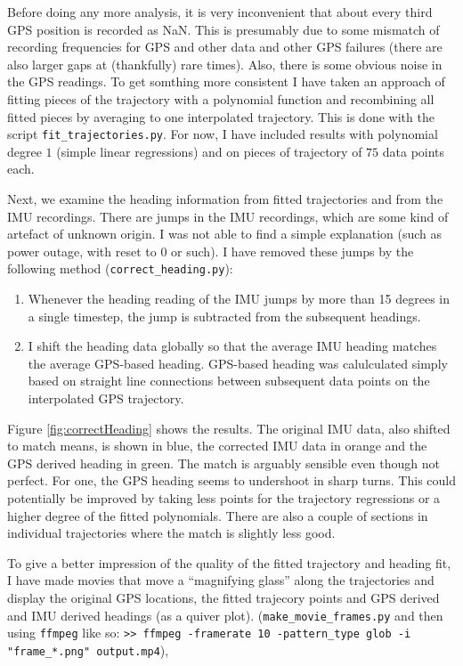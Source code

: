 \documentclass[a4]{article}
\begin{document}
Before doing any more analysis, it is very inconvenient that about
every third GPS position is recorded as NaN. This is presumably due to
some mismatch of recording frequencies for GPS and other data and
other GPS failures (there are also larger gaps at (thankfully) rare
times). Also, there is some obvious noise in the GPS readings. To get
somthing more consistent I have taken an approach of fitting pieces of
the trajectory with a polynomial function and recombining all fitted
pieces by averaging to one interpolated trajectory. This is done with the script
\verb+fit_trajectories.py+. For now, I have included results with
polynomial degree $1$ (simple linear regressions) and on pieces of
trajectory of $75$ data points each.

Next, we examine the heading information from fitted trajectories and
from the IMU recordings. There are jumps in the IMU recordings, which
are some kind of artefact of unknown origin. I was not able to find a
simple explanation (such as power outage, with reset to 0 or such). I
have removed these jumps by the following method (\verb+correct_heading.py+):
\begin{enumerate}
  \item Whenever the heading reading of the IMU jumps by more than 15
    degrees in a single timestep, the jump is subtracted from the
    subsequent headings.
  \item I shift the heading data globally so that the average IMU
    heading matches the average GPS-based heading. GPS-based heading
    was calulculated simply based on straight line connections between
    subsequent data points on the interpolated GPS trajectory.
\end{enumerate}
Figure \ref{fig:correctHeading} shows the results. The original IMU
data, also shifted to match means, is shown in blue, the corrected IMU
data in orange and the GPS derived heading in green. The match is
arguably sensible even though not perfect. For one, the GPS heading
seems to undershoot in sharp turns. This could potentially be improved
by taking less points for the trajectory regressions or a higher
degree of the fitted polynomials. There are also a couple of sections
in individual trajectories where the match is slightly less good.

To give a better impression of the quality of the fitted trajectory
and heading fit, I have made movies that move a ``magnifying glass''
along the trajectories and display the original GPS locations, the fitted trajecory points and GPS derived and IMU derived headings
(as a quiver plot).
(\verb+make_movie_frames.py+ and then using \verb+ffmpeg+ like so:
\verb+>> ffmpeg -framerate 10 -pattern_type glob -i "frame_*.png" output.mp4+),
\end{document}
